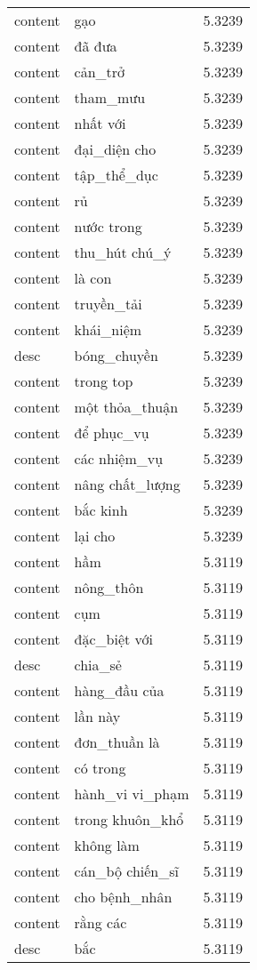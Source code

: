 \documentclass{article}
\begin{document}
\begin{tabular}{lll}
content & gạo & 5.3239\\
content & đã đưa & 5.3239\\
content & cản\_trở & 5.3239\\
content & tham\_mưu & 5.3239\\
content & nhất với & 5.3239\\
content & đại\_diện cho & 5.3239\\
content & tập\_thể\_dục & 5.3239\\
content & rủ & 5.3239\\
content & nước trong & 5.3239\\
content & thu\_hút chú\_ý & 5.3239\\
content & là con & 5.3239\\
content & truyền\_tải & 5.3239\\
content & khái\_niệm & 5.3239\\
desc & bóng\_chuyền & 5.3239\\
content & trong top & 5.3239\\
content & một thỏa\_thuận & 5.3239\\
content & để phục\_vụ & 5.3239\\
content & các nhiệm\_vụ & 5.3239\\
content & nâng chất\_lượng & 5.3239\\
content & bắc kinh & 5.3239\\
content & lại cho & 5.3239\\
content & hầm & 5.3119\\
content & nông\_thôn & 5.3119\\
content & cụm & 5.3119\\
content & đặc\_biệt với & 5.3119\\
desc & chia\_sẻ & 5.3119\\
content & hàng\_đầu của & 5.3119\\
content & lần này & 5.3119\\
content & đơn\_thuần là & 5.3119\\
content & có trong & 5.3119\\
content & hành\_vi vi\_phạm & 5.3119\\
content & trong khuôn\_khổ & 5.3119\\
content & không làm & 5.3119\\
content & cán\_bộ chiến\_sĩ & 5.3119\\
content & cho bệnh\_nhân & 5.3119\\
content & rằng các & 5.3119\\
desc & bắc & 5.3119\\

\end{tabular}
\end{document}

